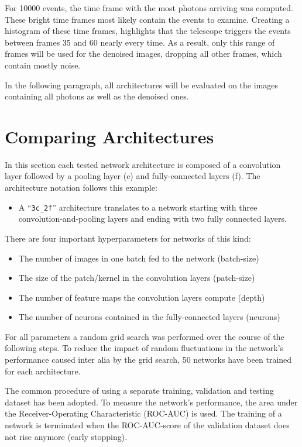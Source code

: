 For \num{10000} events, the time frame with the most photons arriving was computed.
These bright time frames most likely contain the events to examine.
Creating a histogram of these time frames,
highlights that the telescope triggers the events between frames \num{35} and \num{60} nearly every time.
As a result, only this range of frames will be used for the denoised images,
dropping all other frames, which contain mostly noise.

In the following paragraph, all architectures will be evaluated on the images
containing all photons as well as the denoised ones.


\section{Comparing Architectures}
In this section each tested network architecture is composed of a convolution layer followed by a pooling layer (c)
and fully-connected layers (f).
The architecture notation follows this example:

\begin{itemize}
\item A \enquote{\texttt{3c\_2f}} architecture translates to a network
starting with three convolution-and-pooling layers and ending with two fully connected layers.
\end{itemize}

There are four important hyperparameters for networks of this kind:

\begin{itemize}
\item The number of images in one batch fed to the network (batch-size)
\item The size of the patch/kernel in the convolution layers (patch-size)
\item The number of feature maps the convolution layers compute (depth)
\item The number of neurons contained in the fully-connected layers (neurons)
\end{itemize}

For all parameters a random grid search was performed over the course of the following steps.
To reduce the impact of random fluctuations in the network's performance caused inter alia by the grid search,
\num{50} networks have been trained for each architecture.

The common procedure of using a separate training, validation and testing dataset has been adopted.
To measure the network's performance, the area under the Receiver-Operating Characteristic (ROC-AUC) \cite{roc_auc} is used.
The training of a network is terminated when the ROC-AUC-score of the validation dataset does not rise anymore (early stopping).

